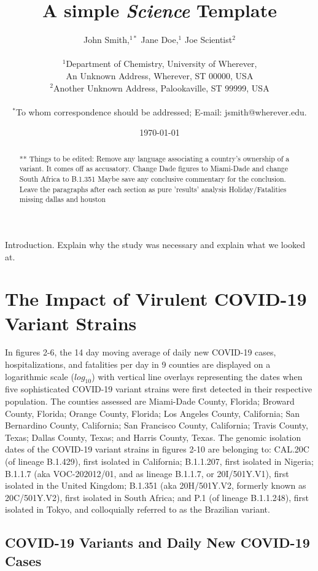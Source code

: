 \documentclass[]{article}
\title{A simple {\it Science\/} Template}
\author
{John Smith,$^{1\ast}$ Jane Doe,$^{1}$ Joe Scientist$^{2}$\\
	\\
	\normalsize{$^{1}$Department of Chemistry, University of Wherever,}\\
	\normalsize{An Unknown Address, Wherever, ST 00000, USA}\\
	\normalsize{$^{2}$Another Unknown Address, Palookaville, ST 99999, USA}\\
	\\
	\normalsize{$^\ast$To whom correspondence should be addressed; E-mail:  jsmith@wherever.edu.}
}
\date{\today}
\begin{document}
	
\baselineskip24pt

\maketitle

\begin{abstract}
 ** Things to be edited:
 Remove any language associating a country's ownership of a variant. It comes off as accusatory. 
 Change Dade figures to Miami-Dade and change South Africa to B.1.351
  Maybe save any conclusive commentary for the conclusion. Leave the paragraphs after each section as pure 'results' analysis
  Holiday/Fatalities missing dallas and houston
 
\end{abstract}

\indent Introduction. Explain why the study was necessary and explain what we looked at. 

\section{The Impact of Virulent COVID-19 Variant Strains}

\indent In figures 2-6, the 14 day moving average of daily new COVID-19 cases, hospitalizations, and fatalities per day in 9 counties are displayed on a logarithmic scale ($log_{10}$) with vertical line overlays representing the dates when five sophisticated COVID-19 variant strains were first detected in their respective population. The counties assessed are Miami-Dade County, Florida; Broward County, Florida; Orange County, Florida; Los Angeles County, California; San Bernardino County, California; San Francisco County, California; Travis County, Texas; Dallas County, Texas; and Harris County, Texas. The genomic isolation dates of the COVID-19 variant strains in figures 2-10 are belonging to: CAL.20C (of lineage B.1.429), first isolated in California; B.1.1.207, first isolated in Nigeria; B.1.1.7 (aka VOC-202012/01, and as lineage B.1.1.7, or 20I/501Y.V1), first isolated in the United Kingdom; B.1.351 (aka 20H/501Y.V2, formerly known as 20C/501Y.V2), first isolated in South Africa; and P.1 (of lineage B.1.1.248), first isolated in Tokyo, and colloquially referred to as the Brazilian variant. 

\subsection{COVID-19 Variants and Daily New COVID-19 Cases}
\end{document}
